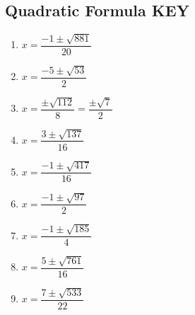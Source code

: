 \documentclass{article}
\begin{document}
\newpage

\subsection*{Quadratic Formula KEY}

\begin{enumerate}
\setlength\itemsep{18pt}
\item $x=\dfrac{-1\pm\sqrt{881}}{20}$ 
\item $x=\dfrac{-5\pm\sqrt{53}}{2}$
\item $x=\dfrac{\pm \sqrt{112}}{8} = \dfrac{\pm\sqrt{7}}{2}$
\item $x=\dfrac{3\pm\sqrt{137}}{16}$
\item $x=\dfrac{-1\pm\sqrt{417}}{16}$
\item $x=\dfrac{-1\pm\sqrt{97}}{2}$
\item $x=\dfrac{-1\pm\sqrt{185}}{4}$
\item $x=\dfrac{5\pm\sqrt{761}}{16}$
\item $x=\dfrac{7\pm\sqrt{533}}{22}$
\end{enumerate}
\end{document}
